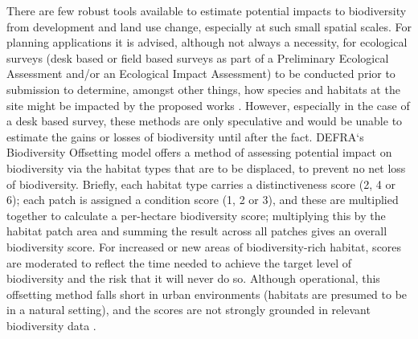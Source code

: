 There are few robust tools available to estimate potential impacts to biodiversity from development and land use change, especially at such small spatial scales.  For planning applications it is advised, although not always a necessity, for ecological surveys (desk based or field based surveys as part of a Preliminary Ecological Assessment and/or an Ecological Impact Assessment) to be conducted prior to submission to determine, amongst other things, how species and habitats at the site might be impacted by the proposed works \citep{Cieem:2016}. However, especially in the case of a desk based survey, these methods are only speculative and would be unable to estimate the gains or losses of biodiversity until after the fact. DEFRA`s Biodiversity Offsetting model \citep{defra:2012bdo} offers a method of assessing potential impact on biodiversity via the habitat types that are to be displaced, to prevent no net loss of biodiversity. Briefly, each habitat type carries a distinctiveness score (2, 4 or 6); each patch is assigned a condition score (1, 2 or 3), and these are multiplied together to calculate a per-hectare biodiversity score; multiplying this by the habitat patch area and summing the result across all patches gives an overall biodiversity score. For increased or new areas of biodiversity-rich habitat, scores are moderated to reflect the time needed to achieve the target level of biodiversity and the risk that it will never do so. Although operational, this offsetting method falls short in urban environments (habitats are presumed to be in a natural setting), and the scores are not strongly grounded in relevant biodiversity data \citep[see][]{Baker:2014bdo}.  


